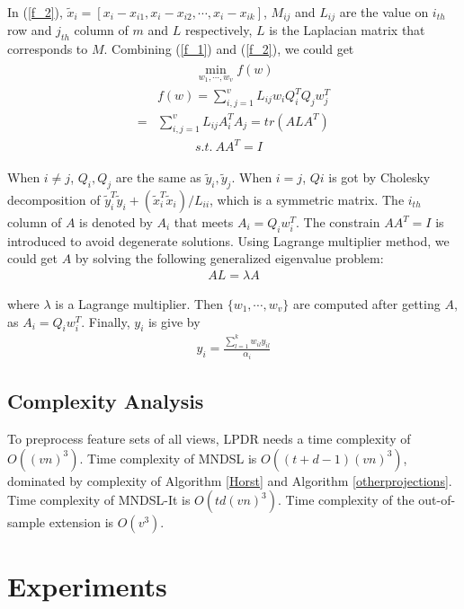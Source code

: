 \documentclass[journal]{IEEEtran}
\begin{document}
In (\ref{f_2}), $\tilde{x}_i=[x_i-x_{i1}, x_i-x_{i2}, \cdots, x_i-x_{ik}]$, $M_{ij}$ and $L_{ij}$ are the value on $i_{th}$ row and $j_{th}$ column of $m$ and $L$ respectively, $L$ is the Laplacian matrix that corresponds to $M$. 
Combining (\ref{f_1}) and (\ref{f_2}), we could get 
\begin{align}
\begin{split}
&\qquad \quad \min_{w_1, \cdots, w_v} f(w) \\
&f(w)=\sum_{i,j=1}^v {L_{ij}} w_iQ_i^TQ_jw_j^T \\
=&\sum_{i,j=1}^v {L_{ij}} A_i^TA_j =tr(A{L}A^T) \\
&\qquad \quad s.t.\ AA^T=I
\end{split}
\end{align}

When $i\neq j$, $Q_i,Q_j$ are the same as $\tilde{y}_i, \tilde{y}_j$. 
When $i=j$, $Qi$ is got by Cholesky decomposition of $\tilde{y}_i^T\tilde{y}_i + (\tilde{x}_i^T \tilde{x}_i)/L_{ii}$, which is a symmetric matrix. 
The $i_{th}$ column of $A$ is denoted by $A_i$ that meets $A_i=Q_iw_i^T$. 
The constrain $AA^T=I$ is introduced to avoid degenerate solutions. 
Using Lagrange multiplier method, we could get $A$ by solving the following generalized eigenvalue problem: 
\begin{gather}
A{L}=\lambda A
\end{gather}

where $\lambda$ is a Lagrange multiplier. 
Then $\{w_1,\cdots, w_v \}$ are computed after getting $A$, as $A_i=Q_iw_i^T$. 
Finally, $y_i$ is give by
\begin{gather}
y_i = \frac{\sum_{l=1}^k w_{il}y_{il} }{\alpha_i }
\end{gather}


\subsection{Complexity Analysis}
To preprocess feature sets of all views, LPDR needs a time complexity of $O((vn)^3)$. 
Time complexity of MNDSL is $O((t+d-1)(vn)^3)$, dominated by complexity of Algorithm \ref{Horst} and Algorithm \ref{otherprojections}. 
Time complexity of MNDSL-It is $O(td(vn)^3)$. 
Time complexity of the out-of-sample extension is $O(v^3)$. 


\section{Experiments} \label{expressions}
\end{document}
